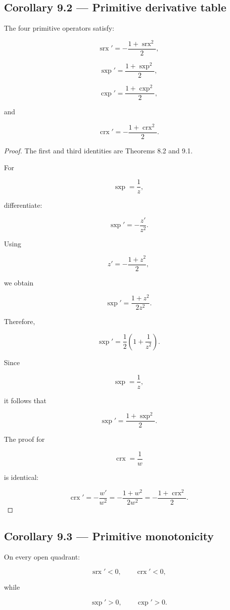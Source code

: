 \documentclass[11pt,oneside,openany]{book}
\newcommand{\PCsubsection}[1]{%
  \subsection*{#1}%
}
\begin{document}
\PCsubsection{Corollary 9.2 --- Primitive derivative table}

The four primitive operators satisfy:

\[
\boxed{ \operatorname{srx}' = -\frac{1+\operatorname{srx}^2}{2} },
\]

\[
\boxed{ \operatorname{sxp}' = \frac{1+\operatorname{sxp}^2}{2} },
\]

\[
\boxed{ \operatorname{cxp}' = \frac{1+\operatorname{cxp}^2}{2} },
\]

and

\[
\boxed{ \operatorname{crx}' = -\frac{1+\operatorname{crx}^2}{2} }.
\]

\begin{proof}
The first and third identities are Theorems 8.2 and 9.1.

For

\[
\operatorname{sxp}=\frac1z,
\]

differentiate:

\[
\operatorname{sxp}' = -\frac{z'}{z^2}.
\]

Using

\[
z'=-\frac{1+z^2}{2},
\]

we obtain

\[
\operatorname{sxp}' = \frac{1+z^2}{2z^2}.
\]

Therefore,

\[
\operatorname{sxp}' = \frac12 \left( 1+\frac1{z^2} \right).
\]

Since

\[
\operatorname{sxp}=\frac1z,
\]

it follows that

\[
\operatorname{sxp}' = \frac{1+\operatorname{sxp}^2}{2}.
\]

The proof for

\[
\operatorname{crx}=\frac1w
\]

is identical:

\[
\operatorname{crx}' = -\frac{w'}{w^2} = -\frac{1+w^2}{2w^2} = -\frac{1+\operatorname{crx}^2}{2}.
\]

\end{proof}

\PCsubsection{Corollary 9.3 --- Primitive monotonicity}

On every open quadrant:

\[
\operatorname{srx}'<0, \qquad \operatorname{crx}'<0,
\]

while

\[
\operatorname{sxp}'>0, \qquad \operatorname{cxp}'>0.
\]
\end{document}
